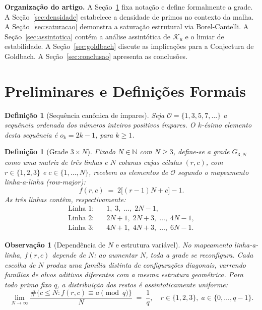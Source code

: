 \documentclass{article}
\newtheorem{remark}[proposition]{Observação}
\newtheorem{definition}[proposition]{Definição}
\begin{document}
	\medskip
	\noindent\textbf{Organização do artigo.}
	A Seção~\ref{sec:prelim} fixa notação e define formalmente a grade.
	A Seção~\ref{sec:densidade} estabelece a densidade de primos no
	contexto da malha. A Seção~\ref{sec:saturacao} demonstra a saturação
	estrutural via Borel-Cantelli. A Seção~\ref{sec:assintotica} contém
	a análise assintótica de $\mathcal{K}_u$ e o limiar de estabilidade.
	A Seção~\ref{sec:goldbach} discute as implicações para a Conjectura
	de Goldbach. A Seção~\ref{sec:conclusao} apresenta as conclusões.
	
	\section{Preliminares e Definições Formais}
	\label{sec:prelim}
	
	\begin{definition}[Sequência canônica de ímpares]
		Seja $\mathcal{O} = \{1, 3, 5, 7, \ldots\}$ a sequência ordenada
		dos números inteiros positivos ímpares. O $k$-ésimo elemento
		desta sequência é $o_k = 2k - 1$, para $k \geq 1$.
	\end{definition}
	
	\begin{definition}[Grade $3 \times N$]
		\label{def:grade}
		Fixado $N \in \mathbb{N}$ com $N \geq 3$, define-se a \emph{grade}
		$G_{3,N}$ como uma matriz de três linhas e $N$ colunas cujas
		células $(r, c)$, com $r \in \{1,2,3\}$ e $c \in \{1,\ldots,N\}$,
		recebem os elementos de $\mathcal{O}$ segundo o mapeamento
		\emph{linha-a-linha} (row-major):
		\[
		f(r, c) \;=\; 2\bigl[(r-1)N + c\bigr] - 1.
		\]
		As três linhas contêm, respectivamente:
		\begin{align*}
			\text{Linha 1:} &\quad 1,\; 3,\; \ldots,\; 2N-1, \\
			\text{Linha 2:} &\quad 2N+1,\; 2N+3,\; \ldots,\; 4N-1, \\
			\text{Linha 3:} &\quad 4N+1,\; 4N+3,\; \ldots,\; 6N-1.
		\end{align*}
	\end{definition}
	
	\begin{remark}[Depend\^encia de $N$ e estrutura vari\'avel]
		No mapeamento linha-a-linha, $f(r,c)$ depende de $N$: ao aumentar $N$,
		toda a grade se reconfigura. Cada escolha de $N$ produz uma
		\emph{fam\'ilia distinta} de configura\c{c}\~oes diagonais, varrendo
		fam\'ilias de alvos aditivos diferentes com a mesma estrutura geom\'etrica.
		Para todo primo fixo $q$, a distribui\c{c}\~ao dos restos \'e assintoticamente
		uniforme:
		\[
		\lim_{N \to \infty}
		\frac{\#\{c \leq N : f(r,c) \equiv a \pmod{q}\}}{N}
		\;=\; \frac{1}{q},
		\quad r \in \{1,2,3\},\; a \in \{0,\ldots,q-1\}.
		\]
	\end{remark}
	
\end{document}
